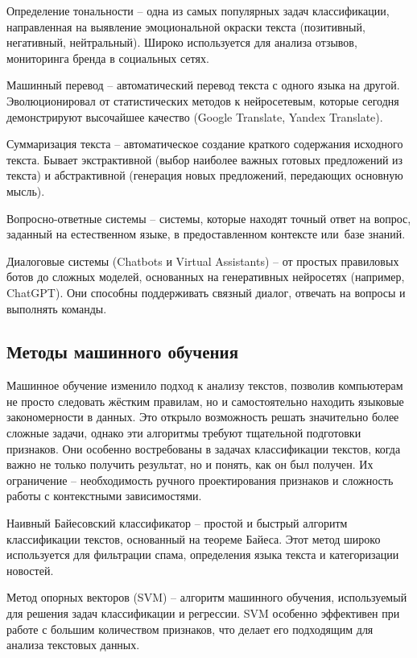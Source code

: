 \documentclass{ou}
\begin{document}
Определение тональности -- одна из самых популярных задач классификации, направленная на выявление эмоциональной окраски текста (позитивный, негативный, нейтральный). Широко используется для анализа отзывов, мониторинга бренда в социальных сетях.

Машинный перевод -- автоматический перевод текста с одного языка на другой. Эволюционировал от статистических методов к нейросетевым, которые сегодня демонстрируют высочайшее качество (Google Translate, Yandex Translate).

Суммаризация текста -- автоматическое создание краткого содержания исходного текста. Бывает экстрактивной (выбор наиболее важных готовых предложений из текста) и абстрактивной (генерация новых предложений, передающих основную мысль).

Вопросно-ответные системы -- системы, которые находят точный ответ на вопрос, заданный на естественном языке, в предоставленном контексте или~базе знаний. 

Диалоговые системы (Chatbots и Virtual Assistants) -- от простых правиловых ботов до сложных моделей, основанных на генеративных нейросетях (например, ChatGPT). Они способны поддерживать связный диалог, отвечать на вопросы и выполнять команды.
\subsection{Методы машинного обучения}
Машинное обучение изменило подход к анализу текстов, позволив компьютерам не просто следовать жёстким правилам, но и самостоятельно находить языковые закономерности в данных. Это открыло возможность решать значительно более сложные задачи, однако эти алгоритмы требуют тщательной подготовки признаков. Они особенно востребованы в задачах классификации текстов, когда важно не только получить результат, но и понять, как он был получен. Их ограничение -- необходимость ручного проектирования признаков и сложность работы с контекстными зависимостями.

Наивный Байесовский классификатор -- простой и быстрый алгоритм классификации текстов, основанный на теореме Байеса. Этот метод широко используется для фильтрации спама, определения языка текста и категоризации новостей. 

Метод опорных векторов (SVM) -- алгоритм машинного обучения, используемый для решения задач классификации и регрессии. SVM особенно эффективен при работе с большим количеством признаков, что делает его подходящим для анализа текстовых данных. 
\end{document}

